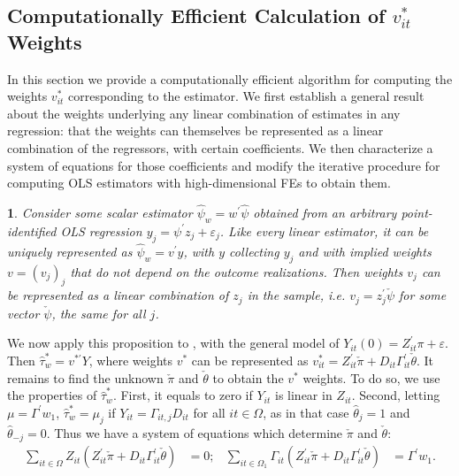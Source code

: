 \documentclass[english,11pt]{article}
\theoremstyle{plain}
\theoremstyle{plain}
\newtheorem{prop}{\protect\propositionname}
\theoremstyle{plain}
\theoremstyle{plain}
\let\ref\Cref
\providecommand{\propositionname}{Proposition}
\begin{document}
\subsection{Computationally Efficient Calculation of $v_{it}^{\ast}$ Weights\label{subsec:appx-Weights-Imputation}}

In this section we provide a computationally efficient algorithm for
computing the weights $v_{it}^{\ast}$ corresponding to the \ref{thm:OLS-BLUE}
estimator. We first establish a general result about the weights underlying
any linear combination of estimates in any regression: that the weights
can themselves be represented as a linear combination of the regressors,
with certain coefficients. We then characterize a system of equations
for those coefficients and modify the iterative procedure for computing
OLS estimators with high-dimensional FEs to obtain them.
\begin{prop}
\textup{\label{lem:linear-est-weights}}Consider some scalar estimator
$\hat{\psi}_{w}=w^{\prime}\hat{\psi}$ obtained from an arbitrary
point-identified OLS regression $y_{j}=\psi^{\prime}z_{j}+\varepsilon_{j}$.
Like every linear estimator, it can be uniquely represented as $\hat{\psi}_{w}=v^{\prime}y$,
with $y$ collecting $y_{j}$ and with implied weights $v=\left(v_{j}\right)_{j}$
that do not depend on the outcome realizations. Then weights $v_{j}$
can be represented as a linear combination of $z_{j}$ in the sample,
i.e. $v_{j}=z_{j}^{\prime}\check{\psi}$ for some vector $\check{\psi}$,
the same for all $j$.
\end{prop}
We now apply this proposition to \ref{thm:OLS-BLUE}, with the general
model of $Y_{it}(0)=Z_{it}^{\prime}\pi+\varepsilon$. Then $\hat{\tau}_{w}^{\ast}=v^{\ast\prime}Y$,
where weights $v^{\ast}$ can be represented as $v_{it}^{\ast}=Z_{it}^{\prime}\check{\pi}+D_{it}\Gamma_{it}^{\prime}\check{\theta}.$
It remains to find the unknown $\check{\pi}$ and $\check{\theta}$
to obtain the $v^{\ast}$ weights. To do so, we use the properties
of $\hat{\tau}_{w}^{\ast}$. First, it equals to zero if $Y_{it}$
is linear in $Z_{it}$. Second, letting $\mu=\Gamma^{\prime}w_{1}$,
$\hat{\tau}_{w}^{\ast}=\mu_{j}$ if $Y_{it}=\Gamma_{it,j}D_{it}$
for all $it\in\Omega$, as in that case $\hat{\theta}_{j}=1$ and
$\hat{\theta}_{-j}=0$. Thus we have a system of equations which determine
$\check{\pi}$ and $\check{\theta}$:
\begin{align}
\sum_{it\in\Omega}Z_{it}\left(Z_{it}^{\prime}\check{\pi}+D_{it}\Gamma_{it}^{\prime}\check{\theta}\right) & =0; & \sum_{it\in\Omega_{1}}\Gamma_{it}\left(Z_{it}^{\prime}\check{\pi}+D_{it}\Gamma_{it}^{\prime}\check{\theta}\right) & =\Gamma^{\prime}w_{1}.\label{eq:iterative}
\end{align}
\end{document}
